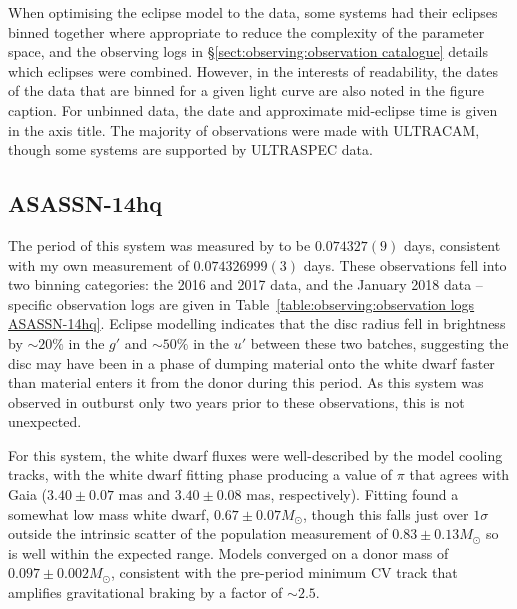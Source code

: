 When optimising the eclipse model to the data, some systems had their eclipses binned together where appropriate to reduce the complexity of the parameter space, and the observing logs in \S\ref{sect:observing:observation catalogue} details which eclipses were combined. However, in the interests of readability, the dates of the data that are binned for a given light curve are also noted in the figure caption. For unbinned data, the date and approximate mid-eclipse time is given in the axis title.
The majority of observations were made with ULTRACAM, though some systems are supported by ULTRASPEC data.



\newpage
\subsection{ASASSN-14hq}

The period of this system was measured by \citep{paterson2019} to be $0.074327(9)$ days, consistent with my own measurement of $0.074326999(3)$ days.
These observations fell into two binning categories: the 2016 and 2017 data, and the January 2018 data -- specific observation logs are given in Table~\ref{table:observing:observation logs ASASSN-14hq}.
Eclipse modelling indicates that the disc radius fell in brightness by $\sim 20\%$ in the $g'$ and $\sim 50\%$ in the $u'$ between these two batches, suggesting the disc may have been in a phase of dumping material onto the white dwarf faster than material enters it from the donor during this period. As this system was observed in outburst only two years prior to these observations, this is not unexpected.

For this system, the white dwarf fluxes were well-described by the model cooling tracks, with the white dwarf fitting phase producing a value of $\pi$ that agrees with Gaia ($3.40\pm0.07$ mas and $3.40\pm0.08$ mas, respectively).
Fitting found a somewhat low mass white dwarf, $0.67 \pm 0.07 M_\odot$, though this falls just over $1\sigma$ outside the intrinsic scatter of the \citet{pala2020} population measurement of $0.83\pm0.13 M_\odot$ so is well within the expected range. Models converged on a donor mass of $0.097\pm0.002 M_\odot$, consistent with the pre-period minimum CV track that amplifies gravitational braking by a factor of $\sim 2.5$.


%     

